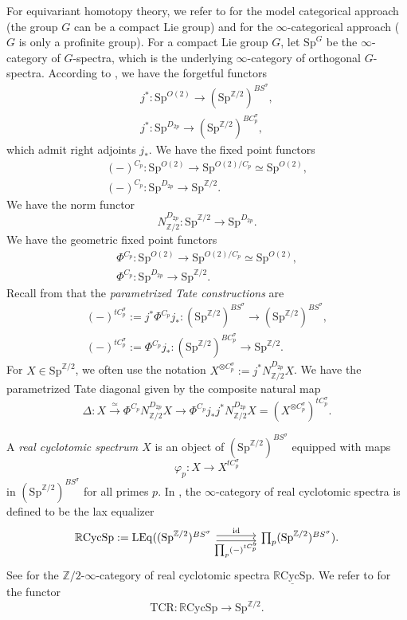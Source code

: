 \documentclass[10pt]{amsart}
\theoremstyle{definition}
\theoremstyle{remark}
\numberwithin{equation}{section}
\newcommand{\Z}{\mathbb{Z}}
\newcommand{\id}{\mathrm{id}}
\newcommand{\ul}{\underline}
\newcommand{\Sp}{\mathrm{Sp}}
\newcommand{\LEq}{\mathrm{LEq}}
\newcommand{\RCycSp}{\mathbb{R}\mathrm{CycSp}}
\newcommand{\TCR}{\mathrm{TCR}}
\newcommand{\Ztwo}{{\mathbb{Z}/2}}
\begin{document}
For equivariant homotopy theory,
we refer to \cite[\S 3]{MR3838307} for the model categorical approach (the group $G$ can be a compact Lie group) and \cite[\S 9]{BH21} for the $\infty$-categorical approach ($G$ is only a profinite group).
For a compact Lie group $G$,
let $\Sp^G$ be the $\infty$-category of $G$-spectra,
which is the underlying $\infty$-category of orthogonal $G$-spectra.
According to \cite[Theorem A, Remark 1.8]{QS1},
we have the forgetful functors
\begin{gather*}
j^*\colon \Sp^{O(2)}
\to
(\Sp^{\Z/2})^{BS^\sigma},
\\
j^*\colon \Sp^{D_{2p}}
\to
(\Sp^{\Z/2})^{BC_p^\sigma},
\end{gather*}
which admit right adjoints $j_*$.
We have the fixed point functors
\begin{gather*}
(-)^{C_p}
\colon
\Sp^{O(2)}
\to
\Sp^{O(2)/C_p}
\simeq
\Sp^{O(2)},
\\
(-)^{C_p}
\colon
\Sp^{D_{2p}}
\to
\Sp^{\Z/2}.
\end{gather*}
We have the norm functor
\[
N_{\Z/2}^{D_{2p}}
\colon
\Sp^{\Z/2}\to \Sp^{D_{2p}}.
\]
We have the geometric fixed point functors
\begin{gather*}
\Phi^{C_p}
\colon
\Sp^{O(2)}
\to
\Sp^{O(2)/C_p}
\simeq
\Sp^{O(2)},
\\
\Phi^{C_p}
\colon
\Sp^{D_{2p}}
\to
\Sp^{\Ztwo}.
\end{gather*}
Recall from \cite[Definition 1.6, Remark 1.8]{QS1} that the \emph{parametrized Tate constructions} are
\begin{gather*}
(-)^{tC_p^\sigma}
:=
j^* \Phi^{C_p} j_*
\colon
(\Sp^{\Z/2})^{BS^\sigma}
\to
(\Sp^{\Z/2})^{BS^\sigma},
\\
(-)^{tC_p^\sigma}
:=
\Phi^{C_p} j_*
\colon
(\Sp^{\Z/2})^{BC_p^\sigma}
\to
\Sp^{\Z/2}.
\end{gather*}
For $X\in \Sp^{\Z/2}$, we often use the notation $X^{\otimes C_p^\sigma}:=j^*N_{\Z/2}^{D_{2p}} X$.
We have the parametrized Tate diagonal given by the composite natural map
\[
\Delta
\colon
X \xrightarrow{\simeq} \Phi^{C_p} N_{\Z/2}^{D_{2p}} X \to \Phi^{C_p} j_*j^* N_{\Z/2}^{D_{2p}} X = (X^{\otimes C_p^\sigma})^{tC_p^\sigma}.
\]




A \emph{real cyclotomic spectrum $X$} is an object of $(\Sp^{\Z/2})^{BS^\sigma}$ equipped with maps
\[
\varphi_p
\colon
X
\to
X^{tC_p^\sigma}
\]
in $(\Sp^{\Z/2})^{BS^\sigma}$ for all primes $p$.
In \cite[Definition 1.20]{QS2},
the $\infty$-category of real cyclotomic spectra is defined to be the lax equalizer
\[
\begin{tikzcd}[column sep=large]
\RCycSp
:=
\LEq((\Sp^{\Z/2})^{BS^\sigma}
\arrow[r,shift left=0.5ex,"\id"]\ar[r,shift right,"\prod_p (-)^{tC_p^\sigma}"']&
\prod_p (\Sp^{\Z/2})^{BS^\sigma}).
\end{tikzcd}
\]
See \cite[Remark 1.21]{QS2} for the $\Z/2$-$\infty$-category of real cyclotomic spectra $\ul{\RCycSp}$.
We refer to \cite[Remark 4.3]{QS2} for the functor
\[
\TCR\colon \RCycSp\to \Sp^{\Z/2}.
\]
\end{document}
